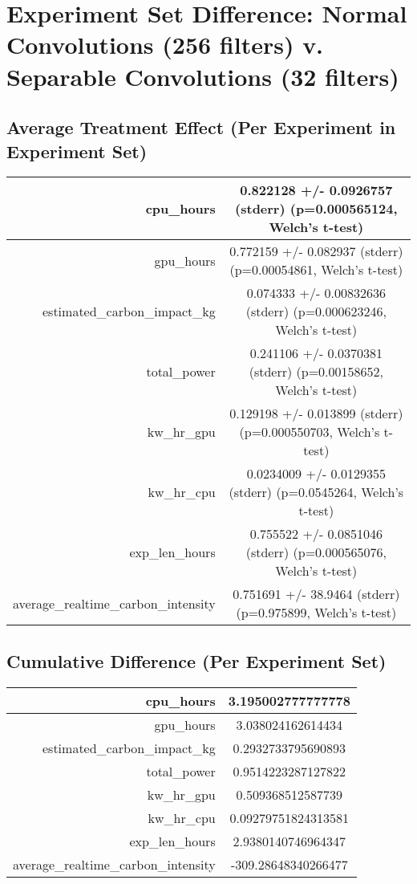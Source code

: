 \documentclass{article}%
\begin{document}
%
\normalsize%
\section{Experiment Set Difference: Normal Convolutions (256 filters) v. Separable Convolutions (32 filters)}%
\label{sec:Experiment Set Difference Normal Convolutions (256 filters) v. Separable Convolutions (32 filters)}%
\subsection{Average Treatment Effect (Per Experiment in Experiment Set)}%
\label{subsec:Average Treatment Effect (Per Experiment in Experiment Set)}%
\begin{tabular}{|r|c|}%
\hline%
cpu\_hours&0.822128 +/{-} 0.0926757 (stderr) (p=0.000565124, Welch's t{-}test)\\%
\hline%
gpu\_hours&0.772159 +/{-} 0.082937 (stderr) (p=0.00054861, Welch's t{-}test)\\%
\hline%
estimated\_carbon\_impact\_kg&0.074333 +/{-} 0.00832636 (stderr) (p=0.000623246, Welch's t{-}test)\\%
\hline%
total\_power&0.241106 +/{-} 0.0370381 (stderr) (p=0.00158652, Welch's t{-}test)\\%
\hline%
kw\_hr\_gpu&0.129198 +/{-} 0.013899 (stderr) (p=0.000550703, Welch's t{-}test)\\%
\hline%
kw\_hr\_cpu&0.0234009 +/{-} 0.0129355 (stderr) (p=0.0545264, Welch's t{-}test)\\%
\hline%
exp\_len\_hours&0.755522 +/{-} 0.0851046 (stderr) (p=0.000565076, Welch's t{-}test)\\%
\hline%
average\_realtime\_carbon\_intensity&0.751691 +/{-} 38.9464 (stderr) (p=0.975899, Welch's t{-}test)\\%
\hline%
\end{tabular}

%
\subsection{Cumulative Difference (Per Experiment Set)}%
\label{subsec:Cumulative Difference (Per Experiment Set)}%
\begin{tabular}{|r|c|}%
\hline%
cpu\_hours&3.195002777777778\\%
\hline%
gpu\_hours&3.038024162614434\\%
\hline%
estimated\_carbon\_impact\_kg&0.2932733795690893\\%
\hline%
total\_power&0.9514223287127822\\%
\hline%
kw\_hr\_gpu&0.509368512587739\\%
\hline%
kw\_hr\_cpu&0.09279751824313581\\%
\hline%
exp\_len\_hours&2.9380140746964347\\%
\hline%
average\_realtime\_carbon\_intensity&{-}309.28648340266477\\%
\hline%
\end{tabular}

%
\end{document}
